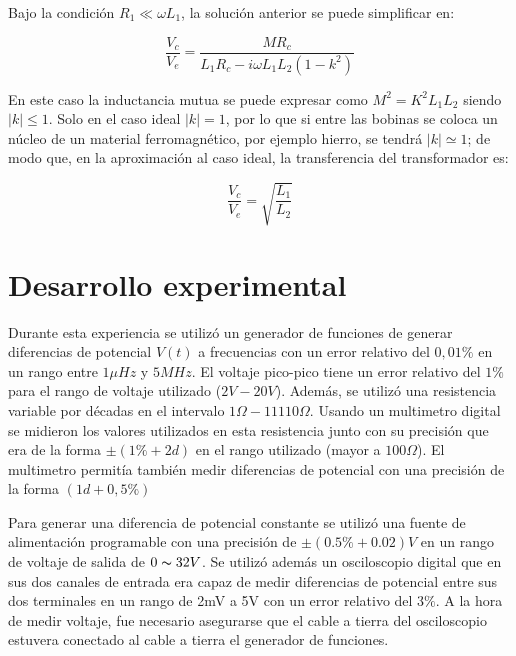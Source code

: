 \documentclass[11pt,a4paper]{article}
\begin{document}
Bajo la condición $R_1 \ll \omega L_1$, la solución anterior se puede simplificar en:

\begin{equation}
\frac{V_c}{V_e}=\frac{MR_c}{L_1R_c-i\omega L_1L_2(1-k^2)}
\label{transf_2}
\end{equation}

En este caso la inductancia mutua se puede expresar como $M^2=K^2L_1L_2$ siendo $\vert k\vert\leq1$. Solo en el caso ideal $\vert k\vert = 1$, por lo que si entre las bobinas se coloca un núcleo de un material ferromagnético, por ejemplo hierro, se tendrá $\vert k\vert \simeq 1$; de modo que, en la aproximación al caso ideal, la transferencia del transformador es:

\begin{equation}
\frac{V_c}{V_e}= \sqrt{\frac{L_1}{L_2}}
\label{trans_3}
\end{equation}




\section{Desarrollo experimental}

Durante esta experiencia se utilizó un generador de funciones de generar diferencias de potencial $V(t)$ a frecuencias con un error relativo del $0,01\%$ en un rango entre $1\mu Hz$ y $5MHz$. El voltaje pico-pico tiene un error relativo del $1\%$ para el rango de voltaje utilizado ($2V-20V$). Además, se utilizó una resistencia variable por décadas en el intervalo $1\Omega-11110\Omega$. Usando un multimetro digital se midieron los valores utilizados en esta resistencia junto con su precisión que era de la forma $\pm(1\%+2d)$ en el rango utilizado (mayor a $100\Omega$). El multimetro permitía también medir diferencias de potencial con una precisión de la forma $(1d+0,5\%)$

Para generar una diferencia de potencial constante se utilizó una fuente de alimentación programable con una precisión de $\pm (0.5\% + 0.02)V$ en un rango de voltaje de salida de $0 \thicksim 32 V$. Se utilizó además un osciloscopio digital que en sus dos canales de entrada era capaz de medir diferencias de potencial entre sus dos terminales en un rango de 2mV a 5V con un error relativo del $3\%$. A la hora de medir voltaje, fue necesario asegurarse que el cable a tierra del osciloscopio estuvera conectado al cable a tierra el generador de funciones. 
\end{document}

